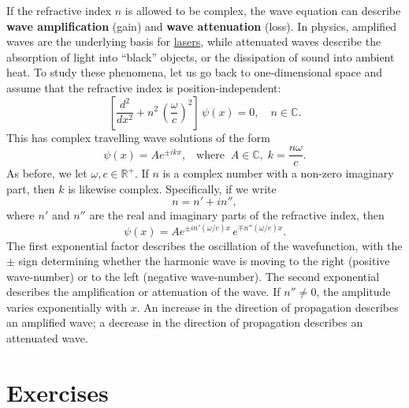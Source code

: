 \documentclass[10pt,a4paper]{article}
\begin{document}
If the refractive index $n$ is allowed to be complex, the wave
equation can describe \textbf{wave amplification} (gain) and
\textbf{wave attenuation} (loss).  In physics, amplified waves are the
underlying basis for
\href{https://en.wikipedia.org/wiki/Laser}{lasers}, while attenuated
waves describe the absorption of light into ``black'' objects, or the
dissipation of sound into ambient heat. To study these phenomena, let
us go back to one-dimensional space and assume that the refractive
index is position-independent:
\begin{equation}
  \left[\frac{d^2}{d x^2} + n^2\, \left(\frac{\omega}{c}\right)^2\right]
  \, \psi(x) = 0, \quad n \in \mathbb{C}.
\end{equation}
This has complex travelling wave solutions of the form
\begin{equation}
  \psi(x) = A e^{\pm ikx},\;\;\;\mathrm{where}\;\;
  A \in \mathbb{C}, \;k = \frac{n\omega}{c}.
  \label{complex_gainloss_wave}
\end{equation}
As before, we let $\omega, c \in \mathbb{R}^+$.  If $n$ is a complex
number with a non-zero imaginary part, then $k$ is likewise complex.
Specifically, if we write
\begin{equation}
  n = n' + i n'',
\end{equation}
where $n'$ and $n''$ are the real and imaginary parts of the
refractive index, then
\begin{equation}
  \psi(x) = A e^{\pm in'(\omega/c)x}\, e^{\mp n''(\omega/c)x}.
  \label{psix}
\end{equation}
The first exponential factor describes the oscillation of the
wavefunction, with the $\pm$ sign determining whether the harmonic
wave is moving to the right (positive wave-number) or to the left
(negative wave-number). The second exponential describes the
amplification or attenuation of the wave.  If $n'' \ne 0$, the
amplitude varies exponentially with $x$.  An increase in the direction
of propagation describes an amplified wave; a decrease in the
direction of propagation describes an attenuated wave.

\section{Exercises}
\end{document}
